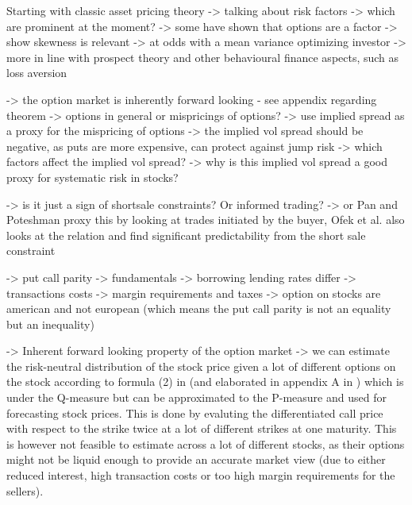 Starting with classic asset pricing theory
 -> talking about risk factors
 -> which are prominent at the moment?
 -> some have shown that options are a factor 
 -> \cite{harvey2000time} show skewness is relevant -> at odds with a mean variance optimizing investor -> more in line with prospect theory and other behavioural finance aspects, such as loss aversion
 
 -> the option market is inherently forward looking - see appendix regarding theorem
 -> options in general or mispricings of options?
 -> use implied spread as a proxy for the mispricing of options 
 -> the implied vol spread should be negative, as puts are more expensive, can protect against jump risk
 -> which factors affect the implied vol spread? 
 -> why is this implied vol spread a good proxy for systematic risk in stocks?
 
 -> is it just a sign of shortsale constraints? Or informed trading?
 -> or Pan and Poteshman proxy this by looking at trades initiated by the buyer, Ofek et al. also looks at the relation and find significant predictability from the short sale constraint
 
 -> put call parity
 -> fundamentals 
 -> borrowing lending rates differ 
 -> transactions costs
 -> margin requirements and taxes
 -> option on stocks are american and not european (which means the put call parity is not an equality but an inequality)


 -> Inherent forward looking property of the option market 
 -> we can estimate the risk-neutral distribution of the stock price given a lot of different options on the stock according to formula (2) in \cite{breeden1978prices} (and elaborated in appendix A in \cite{isakasoption}) which is under the Q-measure but can be approximated to the P-measure and used for forecasting stock prices. This is done by evaluting the differentiated call price with respect to the strike twice at a lot of different strikes at one maturity. This is however not feasible to estimate across a lot of different stocks, as their options might not be liquid enough to provide an accurate market view (due to either reduced interest, high transaction costs or too high margin requirements for the sellers).